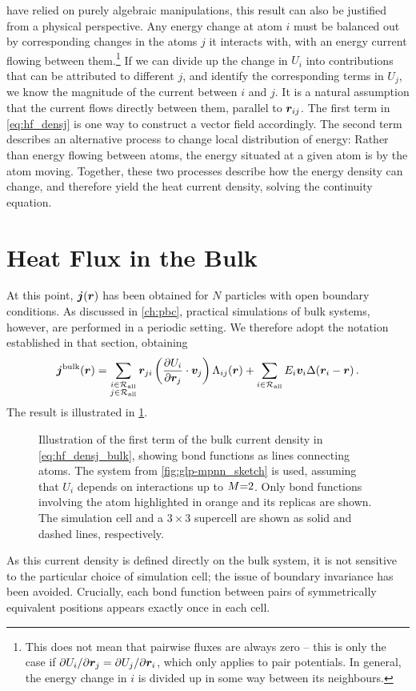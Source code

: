  have relied on purely algebraic manipulations, this result can also be justified from a physical perspective. Any energy change at atom $i$ must be balanced out by corresponding changes in the atoms $j$ it interacts with, with an energy current flowing between them.\footnote[][-3\baselineskip]{This does not mean that pairwise fluxes are always zero -- this is only the case if $\partial U_{i} / \partial \boldsymbol{r}_{j} = \partial U_{j} / \partial \boldsymbol{r}_{i}$, which only applies to pair potentials. In general, the energy change in $i$ is divided up in some way between its neighbours.} If we can divide up the change in $U_i$ into contributions that can be attributed to different $j$, and identify the corresponding terms in $U_j$, we know the magnitude of the current between $i$ and $j$. It is a natural assumption that the current flows directly between them, parallel to $\boldsymbol{r}_{ij}$.
The first term in \cref{eq:hf_densj} is one way to construct a vector field accordingly.
The second term describes an alternative process to change local distribution of energy: Rather than energy flowing between atoms, the energy situated at a given atom is  by the atom moving. Together, these two processes describe how the energy density can change, and therefore yield the heat current density, solving the continuity equation.

\section{Heat Flux in the Bulk}
\label{sec:hf_integrate}

At this point, $\boldsymbol{j}(\boldsymbol{r})$ has been obtained for $N$ particles with open boundary conditions.
As discussed in \cref{ch:pbc}, practical simulations of bulk systems, however, are performed in a periodic setting.
We therefore adopt the notation established in that section, obtaining
\begin{equation}
	\densj^{\text{bulk}}(\R) = \sum_{\substack{i \in \Rall \\ j \in \Rall}} \R_{ji} \left(\dur{i}{j}{} \cdot \V_j\right) \bondf{ij}{\R} + \sum_{i \in \Rall} E_i \V_i \localf{\R_i - \R} \, . \label{eq:hf_densj_bulk}
\end{equation}
The result is illustrated in \cref{fig:hf_densj}.
\begin{figure}
  \centering
  
  \caption{
  Illustration of the first term of the bulk current density in \cref{eq:hf_densj_bulk}, showing bond functions as lines connecting atoms.
  The system from \cref{fig:glp-mpnn_sketch} is used, assuming that $U_i$ depends on interactions up to $M{=}2$. Only bond functions involving the atom highlighted in orange and its replicas are shown. The simulation cell and a $3 \times 3$ supercell are shown as solid and dashed lines, respectively.
  }
  \label{fig:hf_densj}
\end{figure}
As this current density is defined directly on the bulk system, it is not sensitive to the particular choice of simulation cell; the issue of boundary invariance has been avoided.
Crucially, each bond function between pairs of symmetrically equivalent positions appears exactly once in each cell.

